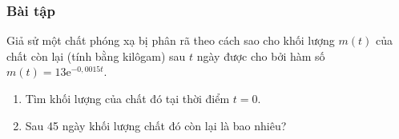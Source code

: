 \subsubsection{Bài tập}
\begin{bt}%
	Giả sử một chất phóng xạ bị phân rã theo cách sao cho khối lượng $m(t)$ của chất còn lại (tính bằng kilôgam) sau $t$ ngày được cho bởi hàm số $m(t) = 13 \mathrm{e}^{-0,0015t}$.
	\begin{enumerate}
		\item Tìm khối lượng của chất đó tại thời điểm $t = 0$.
		\item Sau 45 ngày khối lượng chất đó còn lại là bao nhiêu?
	\end{enumerate}
\end{bt}

